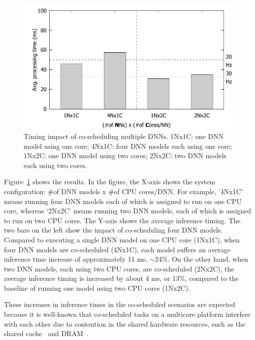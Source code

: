 \begin{figure}[h]
  \centering
  \includegraphics[width=.45\textwidth]{figs/perf_vs_modelcnt}
  \caption{Timing impact of co-scheduling multiple DNNs. 1Nx1C: one DNN
    model using one core; 4Nx1C: four DNN models each using one core;
    1Nx2C: one DNN model using two cores; 2Nx2C: two DNN models each
    using two cores.} 
  \label{fig:perf-vs-modelcnt}
\end{figure}

Figure~\ref{fig:perf-vs-modelcnt} shows the results. In the figure, the
X-axis shows the system configuration: \#of DNN models x \#of CPU
cores/DNN. For example, '4Nx1C' means running four DNN models each of
which is assigned to run on one CPU core, whereas `2Nx2C' means running
two DNN models, each of which is assigned to run on two CPU
cores. The Y-axis shows the average inference timing.
The two bars on the left show the impact of co-scheduling four DNN
models. Compared to executing a single DNN model on one CPU core
(1Nx1C), when four DNN models are co-scheduled (4Nx1C), each model
suffers an average inference time increase of approximately 11 ms,
$\sim$24\%. On the other hand, when two DNN models, each using two CPU
cores, are co-scheduled (2Nx2C), the average inference timing is increased by
about 4 ms, or 13\%, compared to the baseline of running one model
using two CPU cores (1Nx2C). 

These increases in inference times in the co-scheduled scenarios are
expected because it is well-known that co-scheduled tasks on a
multicore platform interfere with each other due to contention in the
shared hardware resources, such as the shared
cache~\cite{Gracioli2015} and DRAM~\cite{Yun2013}.


